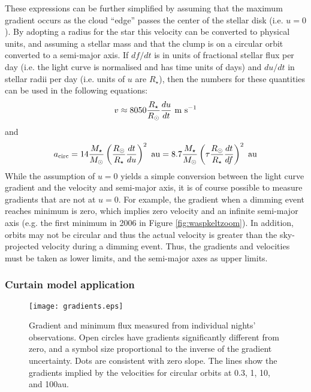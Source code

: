 \documentclass[]{rsos}
\begin{document}
These expressions can be further simplified by assuming that the maximum gradient occurs
as the cloud ``edge'' passes the center of the stellar disk (i.e. $u=0$). By adopting a
radius for the star this velocity can be converted to physical units, and assuming a
stellar mass and that the clump is on a circular orbit converted to a semi-major axis. If
$df/dt$ is in units of fractional stellar flux per day (i.e. the light curve is
normalised and has time units of days) and $du/dt$ in stellar radii per day (i.e. units
of $u$ are $R_\star$), then the numbers for these quantities can be used in the following
equations:
\begin{equation}\label{eq:vcl}
  v \approx  8050 \frac{R_\star}{R_\odot} \frac{du}{dt} ~ {\rm m~s}^{-1}
\end{equation}
and
\begin{equation}\label{eq:acl}
  a_{\rm circ} %
  = 14 \frac{M_\star}{M_\odot} \left( \frac{R_\odot}{R_\star} \frac{dt}{du} \right)^2 ~
  {\rm au}
  = 8.7 \frac{M_\star}{M_\odot} \left( \tau \frac{R_\odot}{R_\star} \frac{dt}{df} \right)^2 ~
  {\rm au}
\end{equation}
While the assumption of $u=0$ yields a simple conversion between the light curve gradient
and the velocity and semi-major axis, it is of course possible to measure gradients that
are not at $u=0$. For example, the gradient when a dimming event reaches minimum is zero,
which implies zero velocity and an infinite semi-major axis (e.g. the first minimum in
2006 in Figure \ref{fig:waspkeltzoom}). In addition, orbits may not be circular and thus
the actual velocity is greater than the sky-projected velocity during a dimming
event. Thus, the gradients and velocities must be taken as lower limits, and the
semi-major axes as upper limits.

\subsubsection{Curtain model application}\label{sss:gradapp}

\begin{figure}
  \begin{center}
    \hspace{-0.5cm} \texttt{[image: gradients.eps]}
    \caption{Gradient and minimum flux measured from individual nights'
      observations. Open circles have gradients significantly different from zero, and a
      symbol size proportional to the inverse of the gradient uncertainty. Dots are
      consistent with zero slope. The lines show the gradients implied by the velocities
      for circular orbits at 0.3, 1, 10, and 100au.}\label{fig:grad}
  \end{center}
\end{figure}
\end{document}
